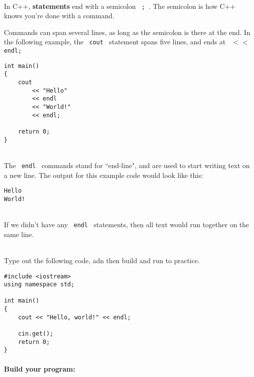 \documentclass[a4paper,12pt]{book}
\begin{document}
                ~\\
                In C++, \textbf{ statements } end with a semicolon \texttt{ ; }.
                The semicolon is how C++ knows you're done with a command.

                \newpage
                Commands can span several lines, as long as the semicolon
                is there at the end. In the following example, the \texttt{ cout }
                statement spans five lines, and ends at \texttt{ $<<$ endl; } \\

\begin{lstlisting}[style=code]
int main()
{
    cout
        << "Hello"
        << endl
        << "World!"
        << endl;
        
    return 0;
}
\end{lstlisting}

                ~\\
                The \texttt{ endl } commands stand for ``end-line",
                and are used to start writing text on a new line.
                The output for this example code would look like this:

\begin{lstlisting}[style=output]
Hello
World!
\end{lstlisting}

                ~\\
                If we didn't have any \texttt{ endl } statements, then
                all text would run together on the same line.

                ~\\

                Type out the following code, adn then build and run to practice.

\begin{lstlisting}[style=code]
#include <iostream>
using namespace std;

int main()
{
    cout << "Hello, world!" << endl;

    cin.get();
    return 0;
}
\end{lstlisting}


                    
                    \newpage
                    \paragraph{ Build your program: }
\end{document}
